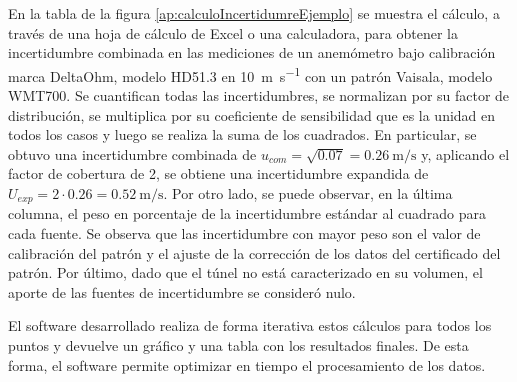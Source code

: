 En la tabla de la figura \ref{ap:calculoIncertidumreEjemplo} se muestra el cálculo, a través de una hoja de cálculo de Excel o una calculadora, para obtener la incertidumbre combinada en las mediciones de un anemómetro bajo calibración marca DeltaOhm, modelo HD51.3 en \SI{10}{\meter\per\second} con un patrón Vaisala, modelo WMT700. Se cuantifican todas las incertidumbres, se normalizan por su factor de distribución, se multiplica por su coeficiente de sensibilidad que es la unidad en todos los casos y luego se realiza la suma de los cuadrados. En particular, se obtuvo una incertidumbre combinada de $u_{com} = \sqrt{0.07} = \SI{0.26}{\meter\per\second}$ y, aplicando el factor de cobertura de 2, se obtiene una incertidumbre expandida de $U_{exp} = 2 \cdot 0.26 = \SI{0.52}{\meter\per\second}$. Por otro lado, se puede observar, en la última columna, el peso en porcentaje de la incertidumbre estándar al cuadrado para cada fuente. Se observa que las incertidumbre con mayor peso son el valor de calibración del patrón y el ajuste de la corrección de los datos del certificado del patrón. Por último, dado que el túnel no está caracterizado en su volumen, el aporte de las fuentes de incertidumbre se consideró nulo.

El software desarrollado realiza de forma iterativa estos cálculos para todos los puntos y devuelve un gráfico y una tabla con los resultados finales. De esta forma, el software permite optimizar en tiempo el procesamiento de los datos.


\newpage
{}
